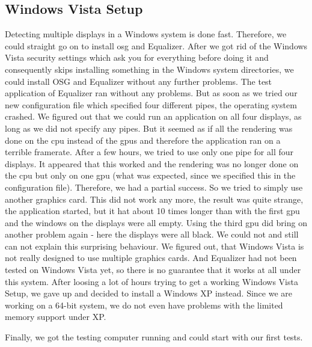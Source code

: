 \subsection{Windows Vista Setup}
Detecting multiple displays in a Windows system is done fast. Therefore, we could straight go on to install \gls{osg} and Equalizer. After we got rid of the Windows Vista security settings which ask you for everything before doing it and consequently skips installing something in the Windows system directories, we could install OSG and Equalizer without any further problems. 
The test application of Equalizer ran without any problems. But as soon as we tried our new configuration file which specified four different pipes, the operating system crashed. We figured out that we could run an application on all four displays, as long as we did not specify any pipes. But it seemed as if all the rendering was done on the \gls{cpu} instead of the \glspl{gpu} and therefore the application ran on a terrible framerate.
After a few hours, we tried to use only one pipe for all four displays. It appeared that this worked and the rendering was no longer done on the \gls{cpu} but only on one \gls{gpu} (what was expected, since we specified this in the configuration file). Therefore, we had a partial success. So we tried to simply use another graphics card. This did not work any more, the result was quite strange, the application started, but it hat about 10 times longer than with the first \gls{gpu} and the windows on the displays were all empty.
Using the third \gls{gpu} did bring on another problem again - here the displays were all black. We could not and still can not explain this surprising behaviour. We figured out, that Windows Vista is not really designed to use multiple graphics cards. And Equalizer had not been tested on Windows Vista yet, so there is no guarantee that it works at all under this system.
After loosing a lot of hours trying to get a working Windows Vista Setup, we gave up and decided to install a Windows XP instead. Since we are working on a 64-bit system, we do not even have problems with the limited memory support under XP.

Finally, we got the testing computer running and could start with our first tests.

